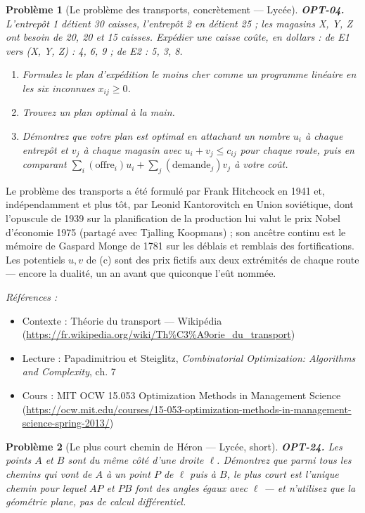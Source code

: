 \documentclass[11pt]{article}
\newtheorem{problem}{Problème}
\newenvironment{refs}{\par\small\noindent\emph{Références :}\begin{itemize}\setlength\itemsep{0pt}}{\end{itemize}\normalsize}
\begin{document}
\bigskip

\begin{problem}[{Le problème des transports, concrètement --- Lycée}]
\textbf{OPT-04.} L'entrepôt 1 détient 30 caisses, l'entrepôt 2 en détient 25 ; les magasins X, Y, Z ont besoin de 20, 20 et 15 caisses. Expédier une caisse coûte, en dollars : de E1 vers (X, Y, Z) : 4, 6, 9 ; de E2 : 5, 3, 8.
\begin{enumerate}
\item[(a)] Formulez le plan d'expédition le moins cher comme un programme linéaire en les six inconnues $x_{ij} \ge 0$.
\item[(b)] Trouvez un plan optimal à la main.
\item[(c)] Démontrez que votre plan est optimal en attachant un nombre $u_i$ à chaque entrepôt et $v_j$ à chaque magasin avec $u_i + v_j \le c_{ij}$ pour chaque route, puis en comparant $\sum_i (\text{offre}_i) u_i + \sum_j (\text{demande}_j) v_j$ à votre coût.
\end{enumerate}

\end{problem}

\noindent Le problème des transports a été formulé par Frank Hitchcock en 1941 et, indépendamment et plus tôt, par Leonid Kantorovitch en Union soviétique, dont l'opuscule de 1939 sur la planification de la production lui valut le prix Nobel d'économie 1975 (partagé avec Tjalling Koopmans) ; son ancêtre continu est le mémoire de Gaspard Monge de 1781 sur les déblais et remblais des fortifications. Les potentiels $u, v$ de (c) sont des prix fictifs aux deux extrémités de chaque route --- encore la dualité, un an avant que quiconque l'eût nommée.

\begin{refs}
\item Contexte : Théorie du transport --- Wikipédia (\url{https://fr.wikipedia.org/wiki/Th%C3%A9orie_du_transport})
\item Lecture : Papadimitriou et Steiglitz, \textit{Combinatorial Optimization: Algorithms and Complexity}, ch. 7
\item Cours : MIT OCW 15.053 Optimization Methods in Management Science (\url{https://ocw.mit.edu/courses/15-053-optimization-methods-in-management-science-spring-2013/})
\end{refs}

\bigskip

\begin{problem}[{Le plus court chemin de Héron --- Lycée, short}]
\textbf{OPT-24.} Les points $A$ et $B$ sont du même côté d'une droite
$\ell$. Démontrez que parmi tous les chemins qui vont de $A$ à un point $P$ de $\ell$ puis
à $B$, le plus court est l'unique chemin pour lequel $AP$ et $PB$ font des angles égaux avec
$\ell$ --- et n'utilisez que la géométrie plane, pas de calcul différentiel.
\end{problem}
\end{document}
